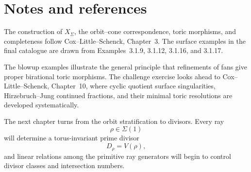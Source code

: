\clearpage
\section*{Notes and references}

The construction of \(X_\Sigma\), the orbit--cone correspondence,
toric morphisms, and completeness follow Cox--Little--Schenck,
Chapter~3. The surface examples in the final catalogue are drawn from
Examples~3.1.9, 3.1.12, 3.1.16, and 3.1.17.

The blowup examples illustrate the general principle that refinements
of fans give proper birational toric morphisms. The challenge exercise
looks ahead to Cox--Little--Schenck, Chapter~10, where cyclic quotient
surface singularities, Hirzebruch--Jung continued fractions, and their
minimal toric resolutions are developed systematically.

The next chapter turns from the orbit stratification to divisors.
Every ray
\[
\rho\in\Sigma(1)
\]
will determine a torus-invariant prime divisor
\[
D_\rho=V(\rho),
\]
and linear relations among the primitive ray generators will begin to
control divisor classes and intersection numbers.
